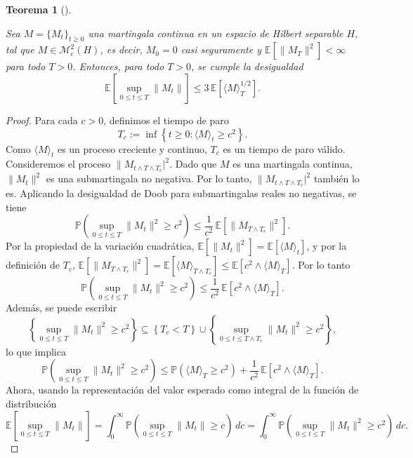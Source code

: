 \documentclass[
  spanish,
  us-letterpaper,
]{scrreprt}
\theoremstyle{plain}
\newtheorem{theorem}{Teorema}[chapter]
\theoremstyle{plain}
\theoremstyle{definition}
\theoremstyle{remark}
\begin{document}
\begin{theorem}[]\protect\hypertarget{thm-des_martingalas_espacios_hilbert}{}\label{thm-des_martingalas_espacios_hilbert}

Sea \(M = \{M_t\}_{t \geq 0}\) una martingala continua en un espacio de
Hilbert separable \(H\), tal que \(M \in \mathcal{M}_c^2(H)\), es decir,
\(M_0 = 0\) casi seguramente y \(\mathbb{E}[\|M_T\|^2] < \infty\) para
todo \(T > 0\). Entonces, para todo \(T > 0\), se cumple la desigualdad
\[\mathbb{E}\left[ \sup_{0 \leq t \leq T} \|M_t\| \right] \leq 3 \, \mathbb{E}\left[ \langle M \rangle_T^{1/2} \right].\]

\end{theorem}

\begin{proof}
Para cada \(c > 0\), definimos el tiempo de paro
\[T_c := \inf \left\{ t \geq 0 : \langle M \rangle_t \geq c^2 \right\}.\]
Como \(\langle M \rangle_t\) es un proceso creciente y continuo, \(T_c\)
es un tiempo de paro válido. Consideremos el proceso
\(\|M_{t \wedge T \wedge T_c}|^2\). Dado que \(M\) es una martingala
continua, \(\|M_t\|^2\) es una submartingala no negativa. Por lo tanto,
\(\|M_{t \wedge T \wedge T_c}|^2\) también lo es. Aplicando la
desigualdad de Doob para submartingalas reales no negativas, se tiene
\[\mathbb{P}\left( \sup_{0 \leq t \leq T} \|M_t\|^2 \geq c^2 \right) \leq \frac{1}{c^2} \, \mathbb{E}\left[ \|M_{T \wedge T_c}\|^2 \right].\]
Por la propiedad de la variación cuadrática,
\(\mathbb{E}[\|M_t\|^2] = \mathbb{E}[\langle M \rangle_t]\), y por la
definición de \(T_c\),
\(\mathbb{E}[\|M_{T \wedge T_c}\|^2] = \mathbb{E}[\langle M \rangle_{T \wedge T_c}] \leq \mathbb{E}[c^2 \wedge \langle M \rangle_T]\).
Por lo tanto
\[\mathbb{P}\left( \sup_{0 \leq t \leq T} \|M_t\|^2 \geq c^2 \right) \leq \frac{1}{c^2} \, \mathbb{E}\left[ c^2 \wedge \langle M \rangle_T \right].\]
Además, se puede escribir
\[\left\{ \sup_{0 \leq t \leq T} \|M_t\|^2 \geq c^2 \right\} \subseteq \left\{ T_c < T \right\} \cup \left\{ \sup_{0 \leq t \leq T \wedge T_c} \|M_t\|^2 \geq c^2 \right\},\]
lo que implica
\[\mathbb{P}\left( \sup_{0 \leq t \leq T} \|M_t\|^2 \geq c^2 \right) \leq \mathbb{P}\left( \langle M \rangle_T \geq c^2 \right) + \frac{1}{c^2} \, \mathbb{E}\left[ c^2 \wedge \langle M \rangle_T \right].\]
Ahora, usando la representación del valor esperado como integral de la
función de distribución
\[ \mathbb{E}\left[ \sup_{0 \leq t \leq T} \|M_t\| \right] = \int_0^\infty \mathbb{P}\left( \sup_{0 \leq t \leq T} \|M_t\| \geq c \right) \, dc = \int_0^\infty \mathbb{P}\left( \sup_{0 \leq t \leq T} \|M_t\|^2 \geq c^2 \right) \, dc.\]

\end{proof}
\end{document}
